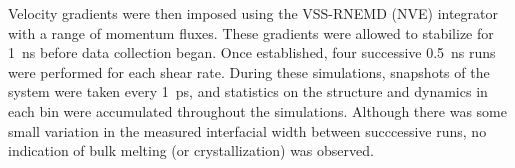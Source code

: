 Velocity gradients were then imposed using the VSS-RNEMD (NVE)
integrator with a range of momentum fluxes.  These gradients were
allowed to stabilize for 1~ns before data collection began. Once
established, four successive 0.5~ns runs were performed for each shear
rate.  During these simulations, snapshots of the system were taken
every 1~ps, and statistics on the structure and dynamics in each bin
were accumulated throughout the simulations.  Although there was some
small variation in the measured interfacial width between succcessive
runs, no indication of bulk melting (or crystallization) was observed.







